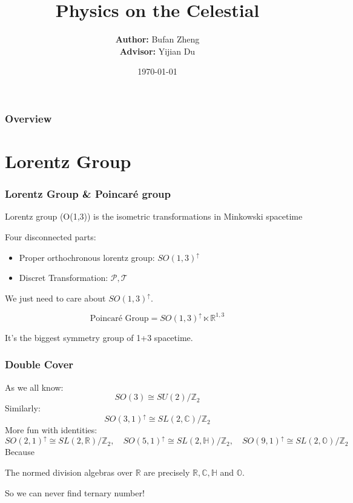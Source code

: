 \documentclass[aspectratio=169]{beamer}%
\title{Physics on the Celestial}
\author[Author names]{%
		\textbf{Author: } 
		Bufan Zheng\\
		\textbf{Advisor: } 
		Yijian Du
}
\institute[WHU] %
{
	Wuhan University\\ %
	\medskip
	\textit{whuzbf@qq.com} %
}
\date{\today} %
\begin{document}
	\begin{frame}
		\titlepage %
	\end{frame}
	
	\begin{frame}
		\frametitle{Overview} %
		\tableofcontents 
	\end{frame}
	\section{Lorentz Group}
	\begin{frame}
		\frametitle{Lorentz Group \& Poincar\'e group}
		\begin{definition}
			Lorentz group (O(1,3)) is the isometric transformations in Minkowski spacetime
		\end{definition}
		Four disconnected parts:
		\begin{itemize}
			\item Proper orthochronous lorentz group: $SO(1,3)^\uparrow$
			\item Discret Transformation: $\mathcal{P,T}$
		\end{itemize}
		We just need to care about $SO(1,3)^\uparrow$.
		\begin{definition}
			\[\text{Poincar\'e Group} = SO(1,3)^\uparrow\ltimes \mathbb{R}^{1,3}\]
		\end{definition}
		It's the biggest symmetry group of 1+3 spacetime.
	\end{frame}
	\begin{frame}
		\frametitle{Double Cover}
		As we all know:
		\begin{equation}
			SO(3)\cong SU(2)/\mathbb{Z}_2
		\end{equation}
		Similarly:
		\begin{equation}
			SO(3,1)^\uparrow\cong SL(2,\mathbb{C})/\mathbb{Z}_2
		\end{equation}
		More fun with identities:
		\begin{equation}
			SO(2,1)^\uparrow\cong SL(2,\mathbb{R})/\mathbb{Z}_2,\quad SO(5,1)^\uparrow\cong SL(2,\mathbb{H})/\mathbb{Z}_2,\quad 
			SO(9,1)^\uparrow\cong SL(2,\mathbb{O})/\mathbb{Z}_2
		\end{equation}
		Because
		\begin{theorem}[Hurwitz]
			The normed division algebras over $\mathbb{R}$ are precisely $\mathbb{R},\mathbb{C},\mathbb{H}$ and $\mathbb{O}$.
		\end{theorem}
		So we can never find ternary number!
	\end{frame}
\end{document}

